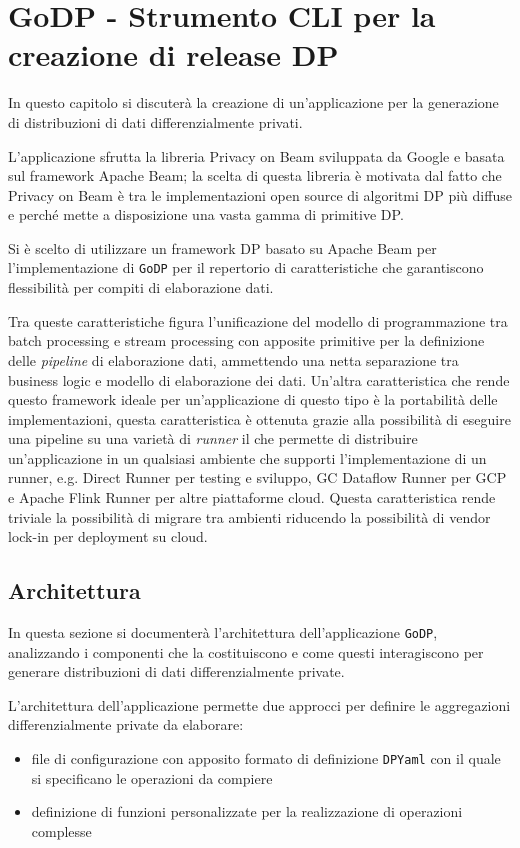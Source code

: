 \chapter{GoDP - Strumento CLI per la creazione di release DP}
In questo capitolo si discuterà la creazione di un'applicazione per la generazione di distribuzioni di dati differenzialmente privati.

L'applicazione sfrutta la libreria Privacy on Beam sviluppata da Google \cite{pbeampac91:online} e basata sul framework Apache Beam; la scelta di questa libreria è motivata dal fatto che Privacy on Beam è tra le implementazioni open source di algoritmi DP più diffuse e perché mette a disposizione una vasta gamma di primitive DP.

Si è scelto di utilizzare un framework DP basato su Apache Beam per l'implementazione di \texttt{GoDP} per il repertorio di caratteristiche che garantiscono flessibilità per compiti di elaborazione dati.

Tra queste caratteristiche figura l'unificazione del modello di programmazione tra batch processing e stream processing con apposite primitive per la definizione delle \textit{pipeline} di elaborazione dati, ammettendo una netta separazione tra business logic e modello di elaborazione dei dati.
Un'altra caratteristica che rende questo framework ideale per un'applicazione di questo tipo è la portabilità delle implementazioni, questa caratteristica è ottenuta grazie alla possibilità di eseguire una pipeline su una varietà di \textit{runner} il che permette di distribuire un'applicazione in un qualsiasi ambiente che supporti l'implementazione di un runner, e.g. Direct Runner per testing e sviluppo, GC Dataflow Runner per GCP e Apache Flink Runner per altre piattaforme cloud. Questa caratteristica rende triviale la possibilità di migrare tra ambienti riducendo la possibilità di vendor lock-in per deployment su cloud.

\section{Architettura}
In questa sezione si documenterà l'architettura dell'applicazione \texttt{GoDP}, analizzando i componenti che la costituiscono e come questi interagiscono per generare distribuzioni di dati differenzialmente private.

L'architettura dell'applicazione permette due approcci per definire le aggregazioni differenzialmente private da elaborare:
\begin{itemize}
    \item file di configurazione con apposito formato di definizione \texttt{DPYaml} con il quale si specificano le operazioni da compiere
    \item definizione di funzioni personalizzate per la realizzazione di operazioni complesse
\end{itemize}

